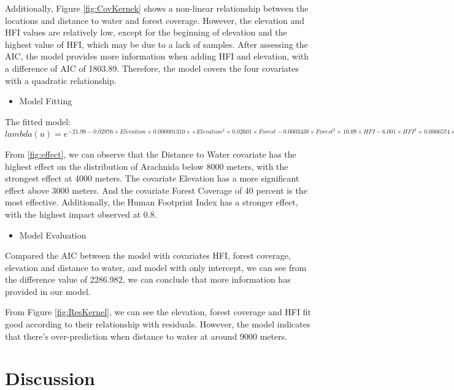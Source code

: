 \documentclass{article}
\providecommand{\tightlist}{%
  \setlength{\itemsep}{0pt}\setlength{\parskip}{0pt}}
\begin{document}
Additionally, Figure \ref{fig:CovKernek} shows a non-linear relationship
between the locations and distance to water and forest coverage.
However, the elevation and HFI values are relatively low, except for the
beginning of elevation and the highest value of HFI, which may be due to
a lack of samples. After assessing the AIC, the model provides more
information when adding HFI and elevation, with a difference of AIC of
1803.89. Therefore, the model covers the four covariates with a
quadratic relationship.

\begin{itemize}
\tightlist
\item
  Model Fitting
\end{itemize}

The fitted model:
\(lambda(u) = e^{-21.98 - 0.02876 \times Elevation + 0.000001310 \times +Elevation^2+0.02601 \times Forest - 0.0003438 \times Forest^2 + 10.09 \times HFI - 6.001 \times HFI^2 + 0.0006574 \times Dist\_Water -0.0000001113 \times Dist\_Water}\)

From \ref{fig:effect}, we can observe that the Distance to Water
covariate has the highest effect on the distribution of Arachnida below
8000 meters, with the strongest effect at 4000 meters. The covariate
Elevation has a more significant effect above 3000 meters. And the
covariate Forest Coverage of 40 percent is the most effective.
Additionally, the Human Footprint Index has a stronger effect, with the
highest impact observed at 0.8.

\begin{itemize}
\tightlist
\item
  Model Evaluation
\end{itemize}

Compared the AIC between the model with covariates HFI, forest coverage,
elevation and distance to water, and model with only intercept, we can
see from the difference value of 2286.982, we can conclude that more
information has provided in our model.

From Figure \ref{fig:ResKernel}, we can see the elevation, forest
coverage and HFI fit good according to their relationship with
residuals. However, the model indicates that there's over-prediction
when distance to water at around 9000 meters.

\hypertarget{discussion}{%
\section*{Discussion}\label{discussion}}
\end{document}
